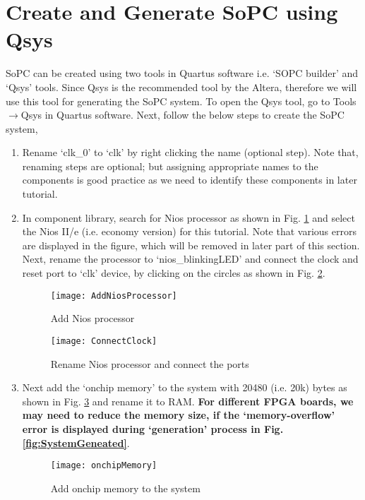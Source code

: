 \section{Create and Generate SoPC using Qsys}\label{sec:CreateGenerateQsys}
SoPC can be created using two tools in Quartus software i.e. `SOPC builder' and `Qsys' tools. Since Qsys is the recommended tool by the Altera, therefore we will use this tool for generating the SoPC system. To open the Qsys tool, go to Tools$\rightarrow$Qsys in Quartus software. Next, follow the below steps to create the SoPC system,
\begin{enumerate}
	\item Rename `clk\_0' to `clk' by right clicking the name (optional step). Note that, renaming steps are optional; but assigning appropriate names to the components is good practice as we need to identify these components in later tutorial. 
	\item In component library, search for Nios processor as shown in Fig. \ref{fig:AddNiosProcessor} and select the Nios II/e (i.e. economy version) for this tutorial. Note that various errors are displayed in the figure, which will be removed in later part of this section. Next, rename the processor to `nios\_blinkingLED' and  connect the clock and reset port to `clk' device, by clicking on the circles as shown in Fig. \ref{fig:ConnectClock}. 
	
	\begin{figure}[!h]
		\centering
		\texttt{[image: AddNiosProcessor]}
		\caption{Add Nios processor}
		\label{fig:AddNiosProcessor}
	\end{figure}
	
	\begin{figure}[!h]
		\centering
		\texttt{[image: ConnectClock]}
		\caption{Rename Nios processor and connect the ports}
		\label{fig:ConnectClock}
	\end{figure}
	
	\item Next add the `onchip memory' to the system with 20480 (i.e. 20k) bytes as shown in Fig. \ref{fig:onchipMemory} and rename it to RAM. \textbf{For different FPGA boards, we may need to reduce the memory size, if the `memory-overflow' error is displayed during `generation' process in Fig. \ref{fig:SystemGeneated}}.
	
		\begin{figure}[!h]
			\centering
			\texttt{[image: onchipMemory]}
			\caption{Add onchip memory to the system}
			\label{fig:onchipMemory}
		\end{figure}
	

\end{enumerate}
